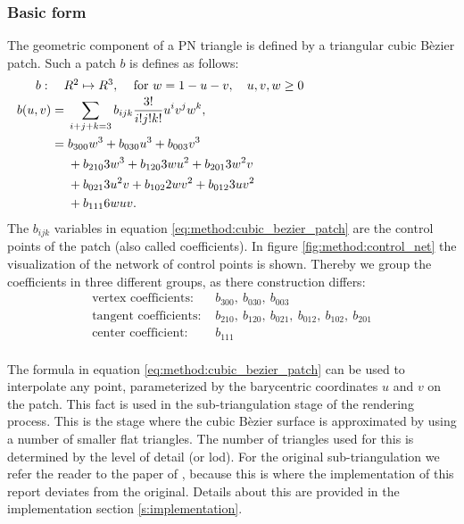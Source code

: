 \subsubsection{Basic form}
The geometric component of a PN triangle is defined by a triangular cubic B\`ezier patch. Such a patch $b$ is defines as follows:
%
\begin{align}
\noalign{$b: \quad R^2 \mapsto R^3,\quad$ for $w = 1 - u - v, \quad u, v, w \geq 0$}
\begin{split}\label{eq:method:cubic_bezier_patch}
    b(u,v) ={}& \sum_{i + j + k = 3} b_{ijk}\frac{3!}{i!j!k!} u^i v^j w^k,\\
      	   ={}& b_{300}w^3 + b_{030}u^3 + b_{003}v^3\\
      	    {}& + b_{210}3w^3 + b_{120}3wu^2 + b_{201}3w^2v\\
      	    {}& + b_{021}3u^2v + b_{102}2wv^2 + b_{012}3uv^2\\
      	    {}& + b_{111}6wuv.
\end{split}
\end{align}
%
The $b_{ijk}$ variables in equation \ref{eq:method:cubic_bezier_patch} are the control points of the patch (also called coefficients). In figure \ref{fig:method:control_net} the visualization of the network of control points is shown. Thereby we group the coefficients in three different groups, as there construction differs:
%
\begin{align*}
	\text{vertex coefficients: } {}&  b_{300},\ b_{030},\ b_{003} \\
	\text{tangent coefficients: } {}&  b_{210},\ b_{120},\ b_{021},\ b_{012},\ b_{102},\ b_{201}\\
	\text{center coefficient: }   {}&  b_{111}\\
\end{align*}

The formula in equation \ref{eq:method:cubic_bezier_patch} can be used to interpolate any point, parameterized by the barycentric coordinates $u$ and $v$ on the patch. This fact is used in the sub-triangulation stage of the rendering process. This is the stage where the cubic B\`ezier surface is approximated by using a number of smaller flat triangles. The number of triangles used for this is determined by the level of detail (or lod). For the original sub-triangulation we refer the reader to the paper of \citeauthor{vlachos2001curved}, because this is where the implementation of this report deviates from the original. Details about this are provided in the implementation section \ref{s:implementation}.

